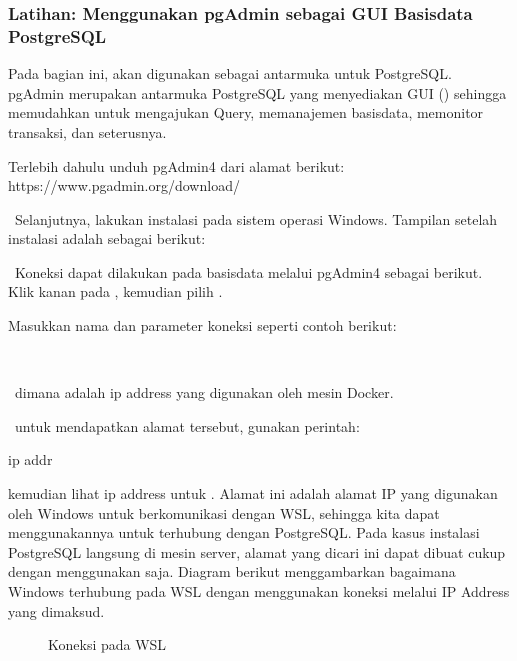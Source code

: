 \documentclass[letterpaper,10pt,english]{sphinxmanual}
\let\sphinxpxdimen\pdfpxdimen\else\newdimen\sphinxpxdimen
\begin{document}
\subsubsection{Latihan: Menggunakan pgAdmin sebagai GUI Basisdata PostgreSQL}
\label{\detokenize{sesi2/relationaldb:latihan-menggunakan-pgadmin-sebagai-gui-basisdata-postgresql}}
Pada bagian ini,  akan digunakan sebagai antarmuka untuk PostgreSQL. pgAdmin merupakan antarmuka PostgreSQL yang menyediakan GUI () sehingga memudahkan untuk mengajukan Query, memanajemen basisdata, memonitor transaksi, dan seterusnya.

Terlebih dahulu unduh pgAdmin4 dari alamat berikut:
https://www.pgadmin.org/download/

 Selanjutnya, lakukan instalasi pada sistem operasi Windows. Tampilan  setelah instalasi adalah sebagai berikut:

 Koneksi dapat dilakukan pada basisdata melalui pgAdmin4 sebagai berikut. Klik kanan pada , kemudian pilih .


Masukkan nama dan parameter koneksi seperti contoh berikut:


 dimana  adalah ip address yang digunakan oleh mesin Docker.
 

 untuk mendapatkan alamat tersebut, gunakan perintah:

\begin{sphinxVerbatim}[commandchars=\\\{\}]
ip addr
\end{sphinxVerbatim}

kemudian lihat ip address untuk . Alamat ini adalah alamat IP yang digunakan oleh Windows untuk berkomunikasi dengan WSL, sehingga kita dapat menggunakannya untuk terhubung dengan PostgreSQL. Pada kasus instalasi PostgreSQL langsung di mesin server, alamat yang dicari ini dapat dibuat cukup dengan menggunakan  saja. Diagram berikut menggambarkan bagaimana Windows terhubung pada WSL dengan menggunakan koneksi melalui IP Address yang dimaksud.

\begin{figure}[htbp]
\centering
\capstart

\noindent\sphinxincludegraphics[height=300\sphinxpxdimen]{{2020-12-03-09-00-55}.png}
\caption{Koneksi pada WSL}\label{\detokenize{sesi2/relationaldb:table2}}\end{figure}
\end{document}
